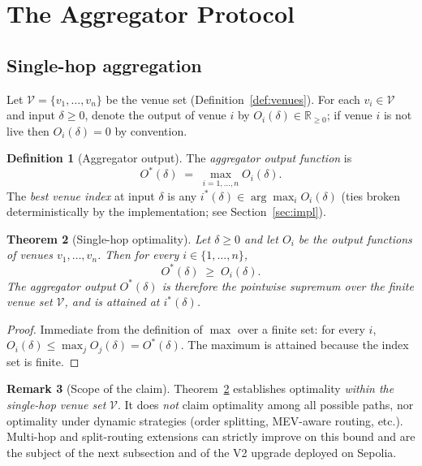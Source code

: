 \documentclass[11pt,a4paper]{article}
\newtheorem{theorem}{Theorem}[section]
\theoremstyle{definition}
\newtheorem{definition}[theorem]{Definition}
\newtheorem{remark}[theorem]{Remark}
\newcommand{\R}{\mathbb{R}}
\newcommand{\Rnn}{\R_{\geq 0}}
\begin{document}
\section{The Aggregator Protocol}
\label{sec:aggregator}

\subsection{Single-hop aggregation}

Let $\mathcal{V} = \{v_1, \dots, v_n\}$ be the venue set
(Definition~\ref{def:venues}). For each $v_i \in \mathcal{V}$ and input
$\delta \geq 0$, denote the output of venue $i$ by $O_i(\delta) \in \Rnn$; if
venue $i$ is not live then $O_i(\delta) = 0$ by convention.

\begin{definition}[Aggregator output]
The \emph{aggregator output function} is
\begin{equation}
    O^*(\delta) \;=\; \max_{i=1,\dots,n} O_i(\delta).
    \label{eq:aggregator}
\end{equation}
The \emph{best venue index} at input $\delta$ is any $i^*(\delta) \in
\arg\max_i O_i(\delta)$ (ties broken deterministically by the implementation;
see Section~\ref{sec:impl}).
\end{definition}

\begin{theorem}[Single-hop optimality]
\label{thm:aggregator-optimal}
Let $\delta \geq 0$ and let $O_i$ be the output functions of venues
$v_1, \dots, v_n$. Then for every $i \in \{1, \dots, n\}$,
\[
    O^*(\delta) \;\geq\; O_i(\delta).
\]
The aggregator output $O^*(\delta)$ is therefore the pointwise supremum over the
finite venue set $\mathcal{V}$, and is attained at $i^*(\delta)$.
\end{theorem}

\begin{proof}
Immediate from the definition of $\max$ over a finite set: for every $i$,
$O_i(\delta) \leq \max_j O_j(\delta) = O^*(\delta)$. The maximum is attained
because the index set is finite.
\end{proof}

\begin{remark}[Scope of the claim]
Theorem~\ref{thm:aggregator-optimal} establishes optimality \emph{within the
single-hop venue set} $\mathcal{V}$. It does \emph{not} claim optimality among
all possible paths, nor optimality under dynamic strategies (order splitting,
MEV-aware routing, etc.). Multi-hop and split-routing extensions can
strictly improve on this bound and are the subject of the next subsection
and of the V2 upgrade deployed on Sepolia.
\end{remark}
\end{document}

